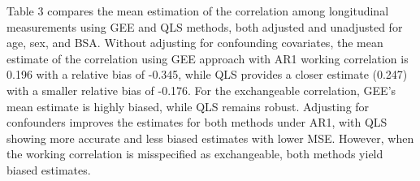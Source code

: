 \documentclass[
]{aft}
\begin{document}
Table 3 compares the mean estimation of the correlation among
longitudinal measurements using GEE and QLS methods, both adjusted and
unadjusted for age, sex, and BSA. Without adjusting for confounding
covariates, the mean estimate of the correlation using GEE approach with
AR1 working correlation is 0.196 with a relative bias of -0.345, while
QLS provides a closer estimate (0.247) with a smaller relative bias of
-0.176. For the exchangeable correlation, GEE's mean estimate is highly
biased, while QLS remains robust. Adjusting for confounders improves the
estimates for both methods under AR1, with QLS showing more accurate and
less biased estimates with lower MSE. However, when the working
correlation is misspecified as exchangeable, both methods yield biased
estimates.

\begin{table}[!h]
\centering\centering
\caption{\footnotesize Comparison of mean estimation for the correlation among longitudinal measurements using GEE and QLS methods, with and without adjustment for age, sex, and BSA.}
\centering
{}
\end{table}
\end{document}
